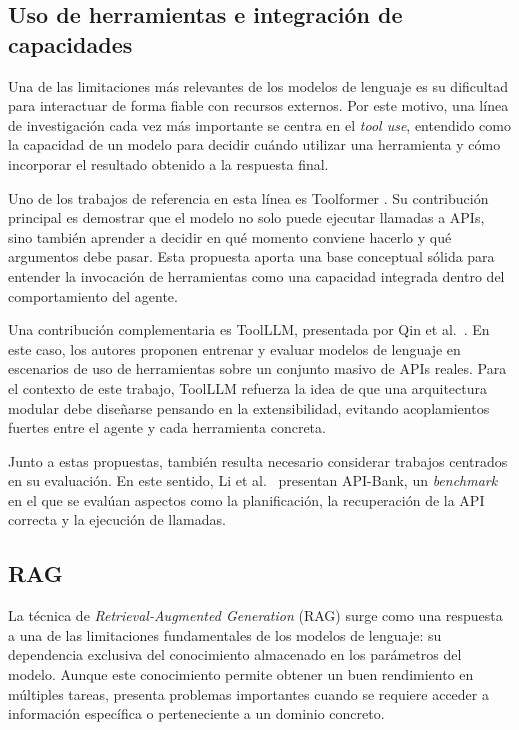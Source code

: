 \subsection{Uso de herramientas e integración de capacidades}

Una de las limitaciones más relevantes de los modelos de lenguaje es su dificultad para interactuar de forma fiable con recursos externos. 
Por este motivo, una línea de investigación cada vez más importante se centra en el \textit{tool use}, entendido como la capacidad de un modelo para decidir cuándo utilizar una herramienta y cómo incorporar el resultado obtenido a la respuesta final.

Uno de los trabajos de referencia en esta línea es Toolformer \cite{schick2023toolformer}. 
Su contribución principal es demostrar que el modelo no solo puede ejecutar llamadas a APIs, sino también aprender a decidir en qué momento conviene hacerlo y qué argumentos debe pasar. 
Esta propuesta aporta una base conceptual sólida para entender la invocación de herramientas como una capacidad integrada dentro del comportamiento del agente.

Una contribución complementaria es ToolLLM, presentada por Qin et al.\ \cite{qin2024toolllm}. 
En este caso, los autores proponen entrenar y evaluar modelos de lenguaje en escenarios de uso de herramientas sobre un conjunto masivo de APIs reales. 
Para el contexto de este trabajo, ToolLLM refuerza la idea de que una arquitectura modular debe diseñarse pensando en la extensibilidad, evitando acoplamientos fuertes entre el agente y cada herramienta concreta.

Junto a estas propuestas, también resulta necesario considerar trabajos centrados en su evaluación. 
En este sentido, Li et al.\ \cite{li2023apibank} presentan API-Bank, un \textit{benchmark} en el que se evalúan aspectos como la planificación, la recuperación de la API correcta y la ejecución de llamadas. 

\subsection{RAG}

La técnica de \textit{Retrieval-Augmented Generation} (RAG) surge como una respuesta a una de las limitaciones fundamentales de los modelos de lenguaje: su dependencia exclusiva del conocimiento almacenado en los parámetros del modelo. 
Aunque este conocimiento permite obtener un buen rendimiento en múltiples tareas, presenta problemas importantes cuando se requiere acceder a información específica o perteneciente a un dominio concreto. 

